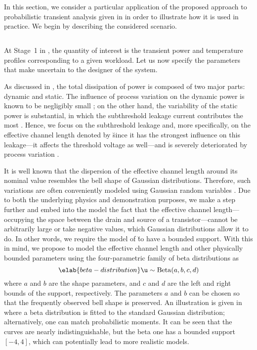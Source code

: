 In this section, we consider a particular application of the proposed approach
to probabilistic transient analysis given in  in
order to illustrate how it is used in practice. We begin by describing the
considered scenario.

\subsection{\problemtitle}

At Stage~1 in , the quantity of interest \g is the
transient power and temperature profiles corresponding to a given workload. Let
us now specify the parameters \vu that make \g uncertain to the designer of the
system.

As discussed in , the total dissipation of power is composed
of two major parts: dynamic and static. The influence of process variation on
the dynamic power is known to be negligibly small \cite{srivastava2010}; on the
other hand, the variability of the static power is substantial, in which the
subthreshold leakage current contributes the most \cite{juan2011, juan2012}.
Hence, we focus on the subthreshold leakage and, more specifically, on the
effective channel length denoted by \u since it has the strongest influence on
this leakage---it affects the threshold voltage as well---and is severely
deteriorated by process variation \cite{chandrakasan2000}.

It is well known that the dispersion of the effective channel length around its
nominal value resembles the bell shape of Gaussian distributions. Therefore,
such variations are often conveniently modeled using Gaussian random variables
\cite{bhardwaj2006, ghanta2006, huang2009a, shen2009, chandra2010,
srivastava2010, juan2011, juan2012, lee2013}. Due to both the underlying physics
and demonstration purposes, we make a step further and embed into the model the
fact that the effective channel length---occupying the space between the drain
and source of a transistor---cannot be arbitrarily large or take negative
values, which Gaussian distributions allow it to do. In other words, we require
the model of \u to have a bounded support. With this in mind, we propose to
model the effective channel length and other physically bounded parameters using
the four-parametric family of beta distributions as
\begin{equation} \elab{beta-distribution}
  \u \sim \mathrm{Beta}(a, b, c, d)
\end{equation}
where $a$ and $b$ are the shape parameters, and $c$ and $d$ are the left and
right bounds of the support, respectively. The parameters $a$ and $b$ can be
chosen so that the frequently observed bell shape is preserved. An illustration
is given in  where a beta distribution is fitted to the
standard Gaussian distribution; alternatively, one can match probabilistic
moments. It can be seen that the curves are nearly indistinguishable, but the
beta one has a bounded support $[-4, 4]$, which can potentially lead to more
realistic models.

